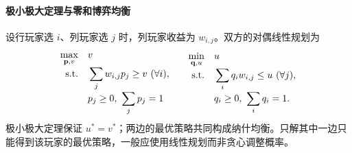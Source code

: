 \paragraph{极小极大定理与零和博弈均衡}
设行玩家选 $i$、列玩家选 $j$ 时，列玩家收益为 $w_{i,j}$。双方的对偶线性规划为
\[\begin{array}{c@{\qquad}c}
\begin{aligned}
\max_{\mathbf p,v}\quad &v\\[-2pt]
\mathrm{s.t.}\quad &\sum_jw_{i,j}p_j\ge v\ (\forall i),\\[-2pt]
&p_j\ge0,\ \sum_jp_j=1
\end{aligned}
&
\begin{aligned}
\min_{\mathbf q,u}\quad &u\\[-2pt]
\mathrm{s.t.}\quad &\sum_iq_iw_{i,j}\le u\ (\forall j),\\[-2pt]
&q_i\ge0,\ \sum_iq_i=1.
\end{aligned}
\end{array}\]
极小极大定理保证 $u^*=v^*$；两边的最优策略共同构成纳什均衡。只解其中一边只能得到该玩家的最优策略，一般应使用线性规划而非贪心调整概率。
